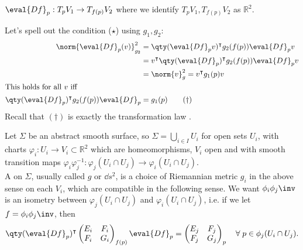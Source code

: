 \begin{note}
	$\eval{Df}_p : T_p V_1 \to T_{f(p)} V_2$ where we identify $T_p V_1, T_{f(p)} V_2$ as $\mathbb{R}^2$.
\end{note} 

Let's spell out the condition ($\star$) using $g_1, g_2$:
\begin{align*}
	\norm{\eval{Df}_p(v)}_{g_2}^2 &= \qty(\eval{Df}_p v)^\tran g_2(f(p)) \eval{Df}_p v \\
	&= v^\tran \qty(\eval{Df}_p)^\tran g_2(f(p)) \eval{Df}_p v \\
	&= \norm{v}_g^2 = v^\tran g_1(p) v \\
	\intertext{This holds for all $v$ iff}
	\qty(\eval{Df}_p)^\tran g_2(f(p)) \eval{Df}_p &= g_1(p) \tag{$\dagger$}
\end{align*} 
Recall that $(\dagger)$ is exactly the transformation law .


\begin{definition}
	Let $\Sigma$ be an abstract smooth surface, so $\Sigma = \bigcup_{i \in I} U_i$ for open sets $U_i$, with charts $\varphi_i \colon U_i \to V_i \subset \mathbb R^2$ which are homeomorphisms, $V_i$ open and with smooth transition maps $\varphi_i \varphi_j^{-1} \colon \varphi_j(U_i \cap U_j) \to \varphi_i(U_i \cap U_j)$.\\
	A  on $\Sigma$, usually called $g$ or $\dd{s}^2$, is a choice of Riemannian metric $g_i$ in the above sense on each $V_i$, which are compatible in the following sense.
	We want $\phi_i \phi_j\inv$ is an isometry between $\varphi_j(U_i \cap U_j)$ and $\varphi_i(U_i \cap U_j)$, i.e. if we let $f = \phi_i \phi_j\inv$, then
	\begin{align*}
		\qty(\eval{Df}_p)^\tran \begin{pmatrix}
			E_i & F_i \\
			F_i & G_i
		\end{pmatrix}_{f(p)} \eval{Df}_p = \begin{pmatrix}
			E_j & F_j \\
			F_j & G_j
		\end{pmatrix}_p \quad \forall \; p \in \phi_j(U_i \cap U_j).
	\end{align*}
\end{definition}

